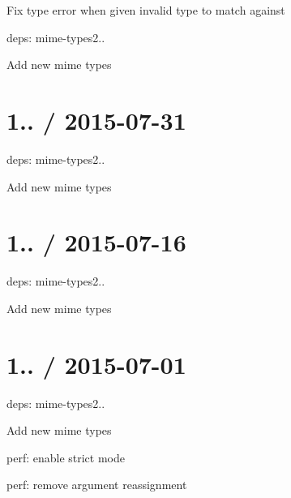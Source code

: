 \begin{DoxyItemize}
\item Fix type error when given invalid type to match against
\item deps\+: mime-\/types2..
\begin{DoxyItemize}
\item Add new mime types
\end{DoxyItemize}
\end{DoxyItemize}

\section*{1.. / 2015-\/07-\/31 }


\begin{DoxyItemize}
\item deps\+: mime-\/types2..
\begin{DoxyItemize}
\item Add new mime types
\end{DoxyItemize}
\end{DoxyItemize}

\section*{1.. / 2015-\/07-\/16 }


\begin{DoxyItemize}
\item deps\+: mime-\/types2..
\begin{DoxyItemize}
\item Add new mime types
\end{DoxyItemize}
\end{DoxyItemize}

\section*{1.. / 2015-\/07-\/01 }


\begin{DoxyItemize}
\item deps\+: mime-\/types2..
\begin{DoxyItemize}
\item Add new mime types
\end{DoxyItemize}
\item perf\+: enable strict mode
\item perf\+: remove argument reassignment
\end{DoxyItemize}

